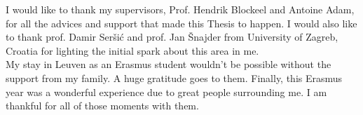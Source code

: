 \documentclass[master=mai,english,openright,fleqn]{kulemt}
\begin{document}
\begin{preface}

	I would like to thank my supervisors, Prof. Hendrik Blockeel and Antoine Adam, for all the advices and support that made this Thesis to happen. I would also like to thank prof. Damir Ser\v{s}i\'{c} and prof. Jan \v{S}najder from University of Zagreb, Croatia for lighting the initial spark about this area in me. \\
	
	My stay in Leuven as an Erasmus student wouldn't be possible without the support from my family. A huge gratitude  goes to them. Finally, this Erasmus year was a wonderful experience due to great people surrounding me. I am thankful for all of those moments with them.
\end{preface}

\tableofcontents*
\end{document}
